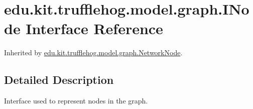 \hypertarget{interfaceedu_1_1kit_1_1trufflehog_1_1model_1_1graph_1_1_i_node}{}\section{edu.\+kit.\+trufflehog.\+model.\+graph.\+I\+Node Interface Reference}
\label{interfaceedu_1_1kit_1_1trufflehog_1_1model_1_1graph_1_1_i_node}


Inherited by \hyperlink{classedu_1_1kit_1_1trufflehog_1_1model_1_1graph_1_1_network_node}{edu.\+kit.\+trufflehog.\+model.\+graph.\+Network\+Node}.



\subsection{Detailed Description}
Interface used to represent nodes in the graph. 
